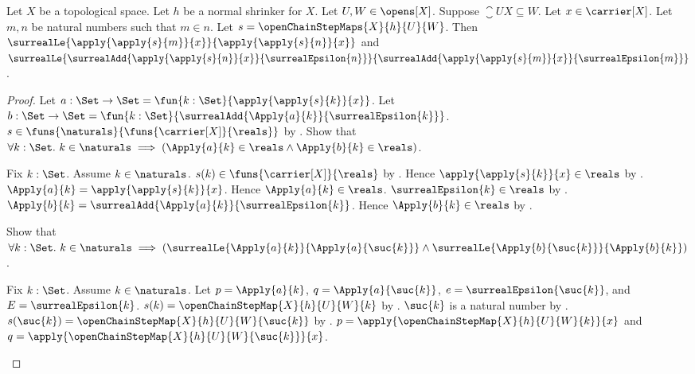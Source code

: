 \begin{theorem}\label{open_chain_step_maps_envelope_monotone}
    Let $X$ be a topological space.
    Let $h$ be a normal shrinker for $X$.
    Let $U,W\in\opens[X]$.
    Suppose $\closure{U}{X}\subseteq W$.
    Let $x\in\carrier[X]$.
    Let $m,n$ be natural numbers such that $m\in n$.
    Let $s=\openChainStepMaps{X}{h}{U}{W}$.
    Then
        $\surrealLe{\apply{\apply{s}{m}}{x}}
            {\apply{\apply{s}{n}}{x}}$ and
        $\surrealLe{
            \surrealAdd{\apply{\apply{s}{n}}{x}}{\surrealEpsilon{n}}}
            {\surrealAdd{\apply{\apply{s}{m}}{x}}{\surrealEpsilon{m}}}$.
\end{theorem}
\begin{proof}
    Let $a:\Set\to\Set
        =\fun{k:\Set}{\apply{\apply{s}{k}}{x}}$.
    Let $b:\Set\to\Set
        =\fun{k:\Set}{
            \surrealAdd{\Apply{a}{k}}{\surrealEpsilon{k}}}$.
    $s\in\funs{\naturals}{\funs{\carrier[X]}{\reals}}$
        by .
    Show that $\forall k:\Set.\ k\in\naturals\implies
        (\Apply{a}{k}\in\reals\land\Apply{b}{k}\in\reals)$.
    \begin{subproof}
        Fix $k:\Set$.
        Assume $k\in\naturals$.
        $s(k)\in\funs{\carrier[X]}{\reals}$
            by .
        Hence $\apply{\apply{s}{k}}{x}\in\reals$
            by .
        $\Apply{a}{k}=\apply{\apply{s}{k}}{x}$.
        Hence $\Apply{a}{k}\in\reals$.
        $\surrealEpsilon{k}\in\reals$
            by .
        $\Apply{b}{k}
            =\surrealAdd{\Apply{a}{k}}{\surrealEpsilon{k}}$.
        Hence $\Apply{b}{k}\in\reals$
            by .
    \end{subproof}
    Show that $\forall k:\Set.\ k\in\naturals\implies
        (\surrealLe{\Apply{a}{k}}{\Apply{a}{\suc{k}}}\land
         \surrealLe{\Apply{b}{\suc{k}}}{\Apply{b}{k}})$.
    \begin{subproof}
        Fix $k:\Set$.
        Assume $k\in\naturals$.
        Let $p=\Apply{a}{k}$, $q=\Apply{a}{\suc{k}}$,
            $e=\surrealEpsilon{\suc{k}}$, and $E=\surrealEpsilon{k}$.
        $s(k)=\openChainStepMap{X}{h}{U}{W}{k}$
            by .
        $\suc{k}$ is a natural number by .
        $s(\suc{k})=\openChainStepMap{X}{h}{U}{W}{\suc{k}}$
            by .
        $p=\apply{\openChainStepMap{X}{h}{U}{W}{k}}{x}$ and
            $q=\apply{\openChainStepMap{X}{h}{U}{W}{\suc{k}}}{x}$.

\end{subproof}
\end{proof}
